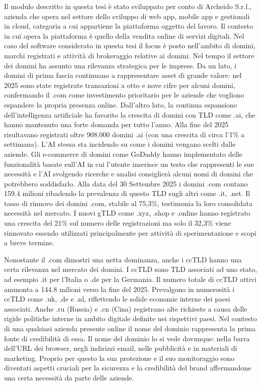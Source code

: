 \documentclass[target=bach,aauheader=,style=]{thud}
\begin{document}
Il modulo descritto in questa tesi è stato sviluppato per conto di Archeido S.r.l., azienda che opera nel settore dello sviluppo di web app, mobile app e gestionali in cloud,
categoria a cui appartiene la piattaforma oggetto del lavoro.
Il contesto in cui opera la piattaforma è quello della vendita online di servizi digitali. Nel caso del software considerato in questa tesi il focus è posto nell'ambito di domini, marchi
registrati e attività di brokeraggio relative ai domini. Nel tempo il settore dei domini ha assunto una rilevanza strategica per le imprese. Da un lato, i
domini di prima fascia continuano a rappresentare asset di grande valore: nel 2025 sono state registrate transazioni a otto e nove cifre per alcuni domini,
confermando il .com come investimento prioritario per le aziende che vogliono espandere la propria presenza online. Dall'altro lato, la continua espansione dell'intelligenza artificiale ha favorito la
crescita di domini con TLD come .ai, che hanno mantenuto una forte domanda per tutto l'anno. Alla fine del 2025 risultavano registrati oltre 908.000 domini .ai (con una crescita di circa l’1\% a settimana).
L'AI stessa sta incidendo su come i domini vengano scelti dalle aziende. Gli e-commerce di domini come GoDaddy \cite{godaddy_it} hanno implementato delle funzionalità basate sull'AI
in cui l'utente inserisce un testo che rappresenti le sue necessità e l'AI svolgendo ricerche e analisi consiglierà alcuni nomi di domini che potrebbero soddisfarlo.
Alla data del 30 Settembre 2025 i domini .com contano 159.4 milioni ribadendo la prevalenza di questo TLD sugli altri come .it, .net. Il tasso di rinnovo dei domini .com, stabile al 75,3\%,
testimonia la loro consolidata necessità nel mercato. I nuovi gTLD come .xyz, .shop e .online hanno registrato una crescita del 21\% sul numero delle registrazioni
ma solo il 32,3\% viene rinnovato essendo utilizzati principalmente per attività di sperimentazione e scopi a breve termine.

Nonostante il .com dimostri una netta dominanza, anche i ccTLD hanno una certa rilevanza nel mercato dei domini. I ccTLD sono TLD associati ad uno stato, ad esempio .it per l'Italia o .de per la Germania.
Il numero totale di ccTLD attivi ammonta a 144.8 milioni verso la fine del 2025. Prevalgono in numerosità i ccTLD come .uk, .de e .nl, riflettendo le solide economie interne dei paesi associati. Anche .ru
(Russia) e .cn (Cina) registrano alte richieste a causa delle rigide politiche interne in ambito digitale definite nei rispettivi paesi.
Nel contesto di una qualsiasi azienda presente online il nome del dominio rappresenta la prima fonte di credibilità di essa. Il nome del dominio lo si vede dovunque: nella barra dell'URL dei browser,
negli indirizzi email, nelle pubblicità e in materiali di marketing. Proprio per questo la sua protezione e il suo monitoraggio sono diventati aspetti cruciali per la sicurezza e la credibilità del brand
affermandone una certa necessità da parte delle aziende.
\end{document}
